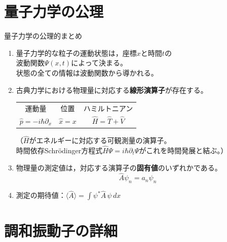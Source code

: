 \documentclass[aspectratio=169, 11pt]{beamer}
\begin{document}
\section{量子力学の公理}

\begin{frame}{量子力学の公理的まとめ}

\begin{enumerate}
  \item 量子力学的な粒子の運動状態は，座標$x$と時間$t$の\\
    波動関数$\Psi(x,t)$によって決まる。\\
    状態の全ての情報は波動関数から導かれる。

  \vspace{0.5em}
  \item 古典力学における物理量に対応する\textbf{線形演算子}が存在する。

    \vspace{0.3em}
    \begin{tabular}{ccc}
      運動量 & 位置 & ハミルトニアン \\
      $\hat{p} = -i\hbar\partial_x$ & $\hat{x} = x$ & $\hat{H} = \hat{T} + \hat{V}$
    \end{tabular}

    \vspace{0.2em}
    {\small （$\hat{H}$がエネルギーに対応する可観測量の演算子。\\
    時間依存Schrödinger方程式$\hat{H}\Psi = i\hbar\partial_t\Psi$がこれを時間発展と結ぶ。）}

  \vspace{0.5em}
  \item 物理量の測定値は，対応する演算子の\textbf{固有値}のいずれかである。
    \[
      \hat{A}\psi_n = a_n\psi_n
    \]

  \vspace{0.3em}
  \item 測定の期待値：$\langle\hat{A}\rangle = \int\psi^*\hat{A}\,\psi\,dx$
\end{enumerate}
\end{frame}

\section{調和振動子の詳細}
\end{document}
